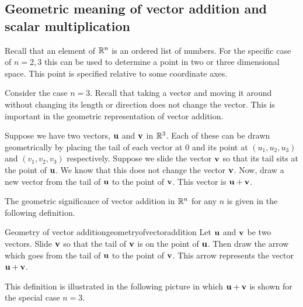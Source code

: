 \subsection{Geometric meaning of vector addition and scalar multiplication}

Recall that an element of $\mathbb{R}^{n}$ is an ordered list of
numbers. For the specific case of $n=2,3$ this can be used to
determine a point in two or three dimensional space. This point is
specified relative to some coordinate axes.

Consider the case $n=3$. Recall that taking a vector and moving it
around without changing its length or direction does not change the
vector. This is important in the geometric representation of vector
addition.

Suppose we have two vectors, ${\bf u}$ and ${\bf v}$ in
$\mathbb{R}^{3}$. Each of these can be drawn geometrically by placing
the tail of each vector at $0$ and its point at $\left( u_{1}, u_{2},
u_{3}\right)$ and $\left( v_{1}, v_{2}, v_{3}\right) $
respectively. Suppose we slide the vector ${\bf v}$ so that its tail
sits at the point of ${\bf u}$.  We know that this does not change
the vector ${\bf v}$.  Now, draw a new vector from the tail of
${\bf u}$ to the point of ${\bf v}$. This vector is
${\bf u}+{\bf v}$.

The geometric significance of vector addition in $\mathbb{R}^n$ for any $n$ is given in
the following definition.

\begin{definition}{Geometry of vector addition}{geometryofvectoraddition}
Let ${\bf u}$ and ${\bf v}$ be two vectors. Slide ${\bf v}$ so that
the tail of ${\bf v}$ is on the point of ${\bf u}$. Then draw the
arrow which goes from the tail of ${\bf u}$ to the point of ${\bf v}$. 
This arrow represents the vector ${\bf u}+{\bf v}$.

\begin{center}
\end{center}
\end{definition}

This definition is illustrated in the following picture in which
${\bf u}+{\bf v}$ is shown for the special case $n=3$.


